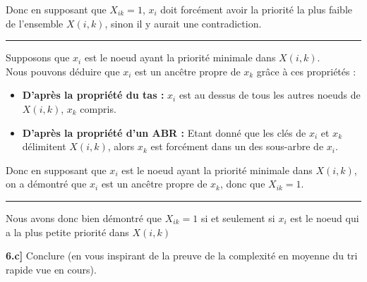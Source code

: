 \documentclass[a4paper,12pt]{report}
\begin{document}
\begin{tcolorbox}[colback=gray!10, colframe=blue!30, coltitle=black, title=Réponse à la 6.b - 1/1]
    \vspace{0.5cm}

    Donc en supposant que \( X_{ik} = 1 \), \( x_i \) doit forcément avoir la priorité la plus faible de l'ensemble \( X(i,k) \), sinon il y aurait une 
        contradiction.

    \vspace{0.5cm}
    \hrule
    \vspace{0.5cm}

    Supposons que \( x_i \) est le noeud ayant la priorité minimale dans \( X(i,k) \).\\

    Nous pouvons déduire que \( x_i \) est un ancêtre propre de \( x_k \) grâce à ces propriétés :\\[-0.4cm]
    \begin{itemize}
        \item \textbf{D'après la propriété du tas :} \( x_i \) est au dessus de tous les autres noeuds de \( X(i,k) \), \( x_k \) compris.
        \item \textbf{D'après la propriété d'un ABR :} Etant donné que les clés de \( x_i \) et \( x_k \) délimitent \( X(i,k) \), alors \( x_k \) est 
            forcément dans un des sous-arbre de \( x_i \).
    \end{itemize}

    \vspace{0.5cm}

    Donc en supposant que \( x_i \) est le noeud ayant la priorité minimale dans \( X(i,k) \), on a démontré que \( x_i \) est un ancêtre propre de \( x_k \),
        donc que \( X_{ik} = 1\).

    \vspace{0.5cm}
    \hrule
    \vspace{0.5cm}

    Nous avons donc bien démontré que \( X_{ik} = 1 \) si et seulement si \( x_i \) est le noeud qui a la plus petite priorité dans \( X(i,k) \)

\end{tcolorbox}




\newpage
{}

\textbf{6.c]} Conclure (en vous inspirant de la preuve de la complexité en moyenne du tri rapide vue en cours).
\end{document}
